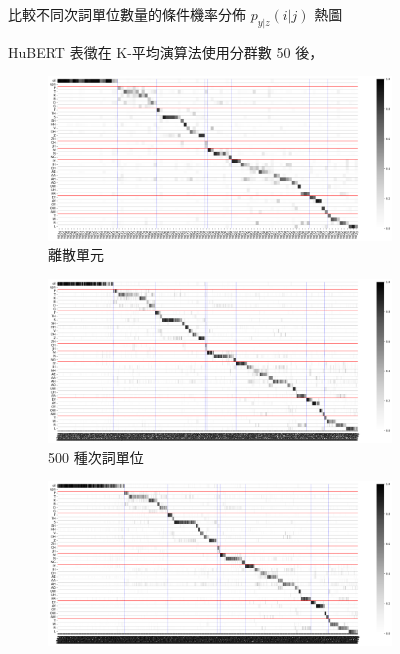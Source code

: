 {{\begin{figure}
             \caption{HuBERT 表徵在 K-平均演算法使用分群數 50 後，}
             比較不同次詞單位數量的條件機率分佈 $p_{y|z}(i | j)$ 熱圖
             \label{fig:hub-u050-comparisons}
        \end{figure}
    }
    {
        \newcommand{\tempwidth}[0]{0.8\linewidth}
        \begin{figure}
             \centering
             \begin{subfigure}{\textwidth}
                 \centering
                 \includegraphics[width=\tempwidth]{figures/ch4figs/hub-u100-ap0000-givenunit-byphn.png}
                 \caption{離散單元}
                 \label{fig:hub-u100-ap0000-givenunit-byphn}
             \end{subfigure}
             \vfill
             \begin{subfigure}{\textwidth}
                 \centering
                 \includegraphics[width=\tempwidth]{figures/ch4figs/hub-u100-ap0500-givenunit-byphn.png}
                 \caption{500 種次詞單位}
                 \label{fig:hub-u100-ap0500-givenunit-byphn}
             \end{subfigure}
             \vfill
             \begin{subfigure}{\textwidth}
                 \centering
                 \includegraphics[width=\tempwidth]{figures/ch4figs/hub-u100-ap1000-givenunit-byphn.png}

\end{subfigure}
\end{figure}}}
